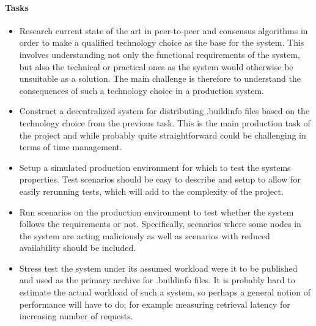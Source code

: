 \documentclass{article}
\begin{document}
\paragraph{Tasks} 

\begin{itemize}
	\item Research current state of the art in peer-to-peer and consensus algorithms in order to make a qualified technology choice as the base for the system. This involves understanding not only the functional requirements of the system, but also the technical or practical ones as the system would otherwise be unsuitable as a solution. The main challenge is therefore to understand the consequences of such a technology choice in a production system.
	\item Construct a decentralized system for distributing .buildinfo files based on the technology choice from the previous task. This is the main production task of the project and while probably quite straightforward could be challenging in terms of time management. 
	\item Setup a simulated production environment for which to test the systems properties. Test scenarios should be easy to describe and setup to allow for easily rerunning tests, which will add to the complexity of the project.
	\item Run scenarios on the production environment to test whether the system follows the requirements or not. Specifically, scenarios where some nodes in the system are acting maliciously as well as scenarios with reduced availability should be included. 
	\item Stress test the system under its assumed workload were it to be published and used as the primary archive for .buildinfo files. It is probably hard to estimate the actual workload of such a system, so perhaps a general notion of performance will have to do; for example measuring retrieval latency for increasing number of requests.
\end{itemize}

\end{document}
